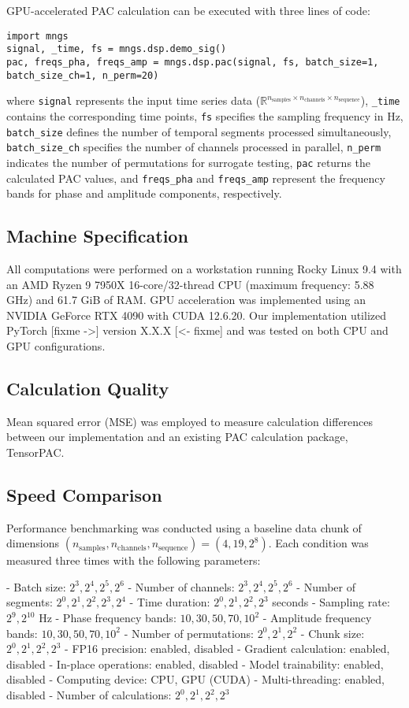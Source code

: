 \documentclass[preprint,review,12pt]{elsarticle}%
\begin{document}
\indent GPU-accelerated PAC calculation can be executed with three lines of code:
\begin{verbatim}
import mngs
signal, _time, fs = mngs.dsp.demo_sig()
pac, freqs_pha, freqs_amp = mngs.dsp.pac(signal, fs, batch_size=1, batch_size_ch=1, n_perm=20)
\end{verbatim}
where \texttt{signal} represents the input time series data ($\mathbb{R}^{n_\text{samples} \times n_\text{channels} \times n_\text{sequence}}$), \texttt{\_time} contains the corresponding time points, \texttt{fs} specifies the sampling frequency in Hz, \texttt{batch\_size} defines the number of temporal segments processed simultaneously, \texttt{batch\_size\_ch} specifies the number of channels processed in parallel, \texttt{n\_perm} indicates the number of permutations for surrogate testing, \texttt{pac} returns the calculated PAC values, and \texttt{freqs\_pha} and \texttt{freqs\_amp} represent the frequency bands for phase and amplitude components, respectively.

\subsection{Machine Specification}
All computations were performed on a workstation running Rocky Linux 9.4 with an AMD Ryzen 9 7950X 16-core/32-thread CPU (maximum frequency: 5.88 GHz) and 61.7 GiB of RAM. GPU acceleration was implemented using an NVIDIA GeForce RTX 4090 with CUDA 12.6.20. Our implementation utilized PyTorch [fixme ->] version X.X.X [<- fixme] and was tested on both CPU and GPU configurations.

\subsection{Calculation Quality}
Mean squared error (MSE) was employed to measure calculation differences between our implementation and an existing PAC calculation package, TensorPAC.


\subsection{Speed Comparison}
Performance benchmarking was conducted using a baseline data chunk of dimensions $(n_\text{samples}, n_\text{channels}, n_\text{sequence}) = (4, 19, 2^8)$. Each condition was measured three times with the following parameters:

- Batch size: $2^3, 2^4, 2^5, 2^6$
- Number of channels: $2^3, 2^4, 2^5, 2^6$  
- Number of segments: $2^0, 2^1, 2^2, 2^3, 2^4$
- Time duration: $2^0, 2^1, 2^2, 2^3$ seconds
- Sampling rate: $2^9, 2^{10}$ Hz
- Phase frequency bands: $10, 30, 50, 70, 10^2$
- Amplitude frequency bands: $10, 30, 50, 70, 10^2$
- Number of permutations: $2^0, 2^1, 2^2$
- Chunk size: $2^0, 2^1, 2^2, 2^3$
- FP16 precision: enabled, disabled
- Gradient calculation: enabled, disabled
- In-place operations: enabled, disabled
- Model trainability: enabled, disabled
- Computing device: CPU, GPU (CUDA)
- Multi-threading: enabled, disabled
- Number of calculations: $2^0, 2^1, 2^2, 2^3$
\end{document}
